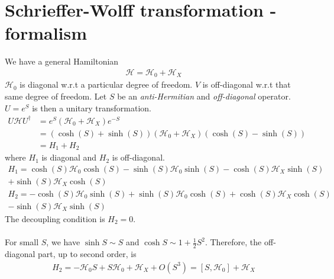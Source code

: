 \documentclass[twoside,11pt]{report}
\numberwithin{equation}{section}
\begin{document}
\section{Schrieffer-Wolff transformation - formalism}
We have a general Hamiltonian
\begin{equation}\begin{aligned}
\mathcal{H} = \mathcal{H}_0 + \mathcal{H}_X
\end{aligned}\end{equation}
\(\mathcal{H}_0\) is diagonal w.r.t a particular degree of freedom. \(V\) is off-diagonal w.r.t that same degree of freedom. Let \(S\) be an \textit{anti-Hermitian} and \textit{off-diagonal} operator. \(U = e^S\) is then a unitary transformation.
\begin{equation}\begin{aligned}
	U \mathcal{H} U^\dagger &= e^S \left(\mathcal{H}_0 + \mathcal{H}_X\right)e^{-S}\\
				&= \left(\cosh\left(S\right) + \sinh\left(S\right)\right)\left(\mathcal{H}_0 + \mathcal{H}_X\right)\left(\cosh\left(S\right) - \sinh\left(S\right)\right)\\
         &= H_1 + H_2
\end{aligned}\end{equation}
where \(H_1\) is diagonal and \(H_2\) is off-diagonal.
\begin{equation}\begin{aligned}
	H_1=\cosh\left(S\right) \mathcal{H}_0 \cosh\left(S\right) - \sinh\left(S\right) \mathcal{H}_0 \sinh\left(S\right) -\cosh\left(S\right) \mathcal{H}_X \sinh\left(S\right)\\
	+\sinh\left(S\right) \mathcal{H}_X \cosh\left(S\right)\\
	H_2 = - \cosh\left(S\right) \mathcal{H}_0 \sinh\left(S\right) + \sinh\left(S\right) \mathcal{H}_0 \cosh\left(S\right) +\cosh\left(S\right) \mathcal{H}_X \cosh\left(S\right)\\
	-\sinh\left(S\right) \mathcal{H}_X \sinh\left(S\right)
\end{aligned}\end{equation}
The decoupling condition is \(H_2=0\).
\\\\For small \(S\), we have \(\sinh S \sim S\) and \(\cosh S \sim 1 + \frac{1}{2} S^2\). Therefore, the off-diagonal part, up to second order, is 
\begin{equation}\begin{aligned}
	H_2 = -\mathcal{H}_0 S + S \mathcal{H}_0 + \mathcal{H}_X + O(S^3) = \left[S,\mathcal{H}_0\right] + \mathcal{H}_X
\end{aligned}\end{equation}
\end{document}
